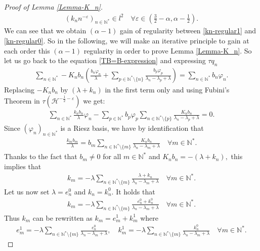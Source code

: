 \documentclass[11pt, dvipsnames]{amsart}
\begin{document}
{\begin{proof}[Proof of Lemma \ref{Lemma-K_n}]
\begin{align}
 (k_n n^{-\varepsilon})_{n\in\mathbb{N}^*}\in l^2 \quad \forall \varepsilon\in \left(\frac{3}{2}-\alpha, \alpha-\frac{1}{2}\right).\label{kn-regular1}  
\end{align}
We can see that we obtain $(\alpha-1)$ gain of regularity between \eqref{kn-regular1} and \eqref{kn-regular0}. So in the following, we will make an iterative principle to gain at each order this $(\alpha-1)$ regularity in order to prove Lemma \ref{Lemma-K_n}. So let us go back to the equation \eqref{TB=B-expression} and expressing $\tau q_n$
\begin{align*}
    \sum_{n\in \mathbb{N}^*}-K_n b_n\left(\frac{b_n\varphi_n}{\lambda}+\sum_{p\in \mathbb{N}^*\setminus\{n\}}\frac{b_p\varphi_p}{\lambda_n-\lambda_p+\lambda}\right)=\sum_{n\in \mathbb{N}^*}b_n\varphi_n.
\end{align*}
Replacing $-K_n b_n$ by $(\lambda+k_n)$ in the first term only and using Fubini's Theorem in $\tau(\mathcal{H}^{-\frac{1}{2}-\varepsilon})$ we get:
\begin{align*}
  \sum_{n\in \mathbb{N}^*}\frac{k_n b_n}{\lambda}\varphi_n-\sum_{p\in \mathbb{N}^*}b_p\varphi_p\sum_{n\in \mathbb{N}^*\setminus\{p\}}\frac{K_n b_n}{\lambda_n-\lambda_p+\lambda}=0.  
\end{align*}
Since $(\varphi_n)_{n\in \mathbb{N}^*}$ is a Riesz basis, we have by identification that
\begin{align*}
  \frac{k_m b_m}{\lambda}=b_m\sum_{n\in \mathbb{N}^*\setminus\{m\}}\frac{K_n b_n}{\lambda_n-\lambda_m+\lambda}\quad \forall m\in \mathbb{N}^*.  
\end{align*}
Thanks to the fact that $b_m\neq 0$ for all $m\in \mathbb{N}^*$ and $K_n b_n=-(\lambda+k_n),$ this implies that 
\begin{align*}
  k_m=-\lambda\sum_{n\in \mathbb{N}^*\setminus\{m\}}\frac{\lambda+k_n}{\lambda_n-\lambda_m+\lambda}\quad \forall m\in \mathbb{N}^*.  
\end{align*}
Let us now set $\lambda=e_n^0$ and $k_n=k_n^0.$ It holds that
\begin{align}
  k_m=-\lambda\sum_{n\in \mathbb{N}^*\setminus\{m\}}\frac{e_n^0+k_n^0}{\lambda_n-\lambda_m+\lambda}\quad \forall m\in \mathbb{N}^*.  \label{kn-def}
\end{align}
Thus $k_m$ can be rewritten as $k_m=e_m^1+k_m^1$ where
\begin{align*}
    e_m^1=-\lambda\sum_{n\in \mathbb{N}^*\setminus\{m\}}\frac{e_n^0}{\lambda_n-\lambda_m+\lambda}, \quad k_m^1=-\lambda\sum_{n\in \mathbb{N}^*\setminus\{m\}}\frac{k_n^0}{\lambda_n-\lambda_m+\lambda} \quad \forall m\in \mathbb{N}^*.

\end{align*}
\end{proof}}
\end{document}
